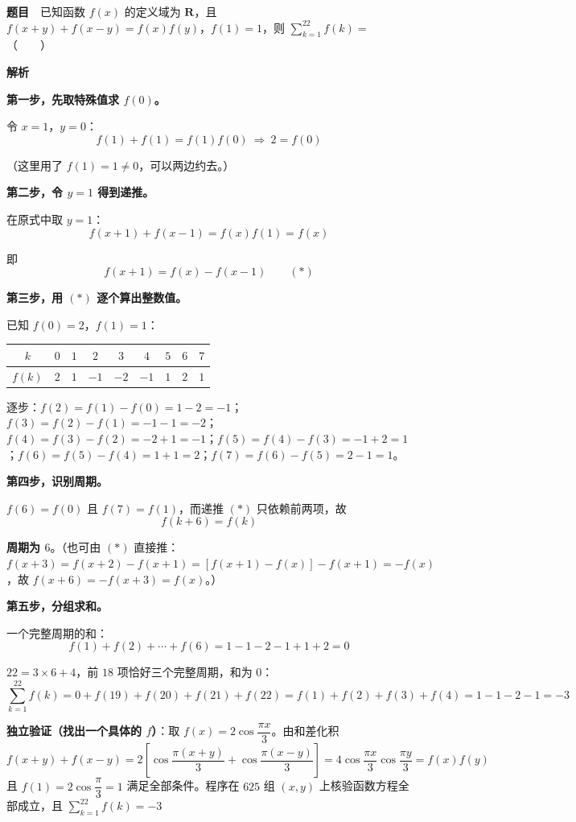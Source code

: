 \par\medskip


\textbf{题目}　已知函数 $f(x)$ 的定义域为 $\mathbf R$，且 $f(x+y)+f(x-y)=f(x)f(y)$，$f(1)=1$，则 $\displaystyle\sum_{k=1}^{22}f(k)=$（　　）

\textbf{解析}

\textbf{第一步，先取特殊值求 $f(0)$。}

令 $x=1$，$y=0$：
\[f(1)+f(1)=f(1)f(0)\ \Longrightarrow\ 2=f(0)\]

（这里用了 $f(1)=1\ne0$，可以两边约去。）

\textbf{第二步，令 $y=1$ 得到递推。}

在原式中取 $y=1$：
\[f(x+1)+f(x-1)=f(x)f(1)=f(x)\]

即
\[f(x+1)=f(x)-f(x-1)\qquad(\ast)\]

\textbf{第三步，用 $(\ast)$ 逐个算出整数值。}

已知 $f(0)=2$，$f(1)=1$：

\begin{center}
\begingroup\setlength{\tabcolsep}{4pt}
\begin{tabular}{ccccccccc}
\toprule
$k$ & $0$ & $1$ & $2$ & $3$ & $4$ & $5$ & $6$ & $7$ \\
\midrule
$f(k)$ & $2$ & $1$ & $-1$ & $-2$ & $-1$ & $1$ & $2$ & $1$ \\
\bottomrule
\end{tabular}
\endgroup
\end{center}

逐步：$f(2)=f(1)-f(0)=1-2=-1$；$f(3)=f(2)-f(1)=-1-1=-2$；$f(4)=f(3)-f(2)=-2+1=-1$；$f(5)=f(4)-f(3)=-1+2=1$；$f(6)=f(5)-f(4)=1+1=2$；$f(7)=f(6)-f(5)=2-1=1$。

\textbf{第四步，识别周期。}

$f(6)=f(0)$ 且 $f(7)=f(1)$，而递推 $(\ast)$ 只依赖前两项，故
\[f(k+6)=f(k)\]

\textbf{周期为 $6$}。（也可由 $(\ast)$ 直接推：$f(x+3)=f(x+2)-f(x+1)=\left[f(x+1)-f(x)\right]-f(x+1)=-f(x)$，故 $f(x+6)=-f(x+3)=f(x)$。）

\textbf{第五步，分组求和。}

一个完整周期的和：
\[f(1)+f(2)+\cdots+f(6)=1-1-2-1+1+2=0\]

$22=3\times6+4$，前 $18$ 项恰好三个完整周期，和为 $0$：
\[\sum_{k=1}^{22}f(k)=0+f(19)+f(20)+f(21)+f(22)=f(1)+f(2)+f(3)+f(4)=1-1-2-1=-3\]

\textbf{独立验证（找出一个具体的 $f$）}：取 $f(x)=2\cos\dfrac{\pi x}3$。由和差化积
\[f(x+y)+f(x-y)=2\left[\cos\frac{\pi(x+y)}3+\cos\frac{\pi(x-y)}3\right]=4\cos\frac{\pi x}3\cos\frac{\pi y}3=f(x)f(y)\]
且 $f(1)=2\cos\dfrac\pi3=1$  满足全部条件。程序在 $625$ 组 $(x,y)$ 上核验函数方程全部成立，且 $\displaystyle\sum_{k=1}^{22}f(k)=-3$ 

